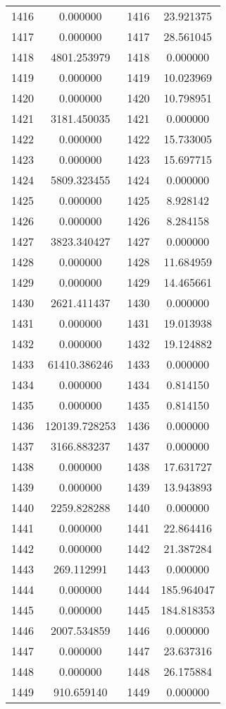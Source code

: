 \documentclass[12pt]{article}
\begin{document}
\begin{longtable}{@{}cccc@{}}
1416 & 0.000000 & 1416 & 23.921375 \\
1417 & 0.000000 & 1417 & 28.561045 \\
1418 & 4801.253979 & 1418 & 0.000000 \\
1419 & 0.000000 & 1419 & 10.023969 \\
1420 & 0.000000 & 1420 & 10.798951 \\
1421 & 3181.450035 & 1421 & 0.000000 \\
1422 & 0.000000 & 1422 & 15.733005 \\
1423 & 0.000000 & 1423 & 15.697715 \\
1424 & 5809.323455 & 1424 & 0.000000 \\
1425 & 0.000000 & 1425 & 8.928142 \\
1426 & 0.000000 & 1426 & 8.284158 \\
1427 & 3823.340427 & 1427 & 0.000000 \\
1428 & 0.000000 & 1428 & 11.684959 \\
1429 & 0.000000 & 1429 & 14.465661 \\
1430 & 2621.411437 & 1430 & 0.000000 \\
1431 & 0.000000 & 1431 & 19.013938 \\
1432 & 0.000000 & 1432 & 19.124882 \\
1433 & 61410.386246 & 1433 & 0.000000 \\
1434 & 0.000000 & 1434 & 0.814150 \\
1435 & 0.000000 & 1435 & 0.814150 \\
1436 & 120139.728253 & 1436 & 0.000000 \\
1437 & 3166.883237 & 1437 & 0.000000 \\
1438 & 0.000000 & 1438 & 17.631727 \\
1439 & 0.000000 & 1439 & 13.943893 \\
1440 & 2259.828288 & 1440 & 0.000000 \\
1441 & 0.000000 & 1441 & 22.864416 \\
1442 & 0.000000 & 1442 & 21.387284 \\
1443 & 269.112991 & 1443 & 0.000000 \\
1444 & 0.000000 & 1444 & 185.964047 \\
1445 & 0.000000 & 1445 & 184.818353 \\
1446 & 2007.534859 & 1446 & 0.000000 \\
1447 & 0.000000 & 1447 & 23.637316 \\
1448 & 0.000000 & 1448 & 26.175884 \\
1449 & 910.659140 & 1449 & 0.000000 \\

\end{longtable}
\end{document}
